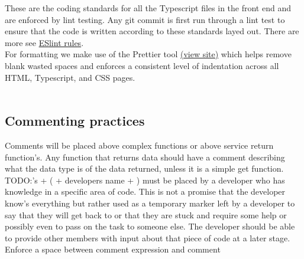 \documentclass[a4paper]{article}
\begin{document}
These are the coding standards for all the Typescript files in the front end and are enforced by lint 
testing. Any git commit is first run through a lint test to ensure that the code is written according to 
these standards layed out. There are more see  \href{https://eslint.org/docs/rules/ }{ESlint rules}.
\\
For formatting we make use of the Prettier tool \href{https://prettier.io/}{(view site)} which helps remove blank wasted spaces and enforces a 
consistent level of indentation across all HTML, Typescript, and CSS pages.
\\\\

\subsection{Commenting practices}
Comments will be placed above complex functions or above service return function's. Any function that returns 
data should have a comment describing what the data type is of the data returned, unless it is a simple get
function. TODO:'s + ( + developers name + ) must be placed by a developer who has knowledge in a specific area of
code. This is not a promise that the developer know's everything but rather used as a temporary marker left by a developer 
to say that they will get back to or that they are stuck and require some help or possibly even to pass on the task to 
someone else. The developer should be able to provide other members with input about that piece of code at a later 
stage. \\
Enforce a space between comment expression and comment   
\end{document}

